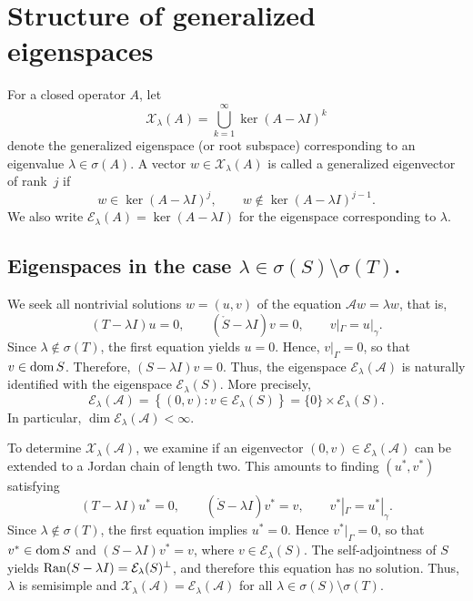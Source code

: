 \documentclass[reqno]{amsart}
\theoremstyle{definition}
\theoremstyle{remark}
\numberwithin{equation}{section}
\newcommand{\dmn}{\mathop{\rm dom}}
\newcommand{\Ran}{\mathop{\rm Ran}}
\newcommand{\cA}{\mathcal{A}}
\newcommand{\cE}{\mathcal{E}}
\newcommand{\cX}{\mathcal{X}}
\begin{document}
\section{Structure of generalized eigenspaces}\label{Section5}
For a closed operator $A$, let
\begin{equation*}
\cX_\lambda(A)=\bigcup_{k=1}^{\infty}\ker(A-\lambda I)^k
\end{equation*}
denote the generalized eigenspace (or root subspace) corresponding to an eigenvalue $\lambda\in\sigma(A)$. A vector $w\in\cX_\lambda(A)$ is called a generalized eigenvector of rank~$j$ if
\begin{equation*}
w\in\ker(A-\lambda I)^j,\qquad w\notin\ker(A-\lambda I)^{j-1}.
\end{equation*}
We also write $\cE_\lambda(A)=\ker(A-\lambda I)$ for the eigenspace corresponding to $\lambda$. 





\subsection{Eigenspaces in the case $\lambda\in\sigma(S)\setminus\sigma(T)$.}
We seek all nontrivial solutions $w=(u,v)$ of the equation $\cA w=\lambda w$, that is,
\begin{equation*}
(T-\lambda I)u=0,\qquad (\mathring{S}-\lambda I)v=0,\qquad v|_\Gamma=u|_\gamma.
\end{equation*}
Since $\lambda\notin\sigma(T)$, the first equation  yields $u=0$. Hence, $v|_\Gamma=0$,  so that $v\in\dmn S$. Therefore, $(S-\lambda I)v=0$. Thus,
the eigenspace $\cE_\lambda(\cA)$ is naturally identified with the eigenspace  $\cE_\lambda(S)$. More precisely,
\begin{equation*}
\cE_\lambda(\cA)=\left\{(0,v)\colon v\in\cE_\lambda(S)\right\}=\{0\}\times\cE_\lambda(S).
\end{equation*}
In particular,
$\dim\cE_\lambda(\cA)<\infty$.

To determine $\cX_\lambda(\cA)$, we examine if an eigenvector $(0,v)\in\cE_\lambda(\cA)$ can be extended to a Jordan chain of length two.
This amounts to finding $(u^*,v^*)$ satisfying
\begin{equation}\label{SystemRank2}
  (T-\lambda I)u^*=0,\qquad   (\mathring S-\lambda I)v^*=v,\qquad   v^*|_\Gamma=u^*|_\gamma.
\end{equation}
Since $\lambda\notin\sigma(T)$, the first equation implies $u^*=0$. Hence $v^*|_\Gamma=0$, so that $v^*\in\dmn S$ and $(S-\lambda I)v^*=v$, where $v\in\cE_\lambda(S)$. The self-adjointness of $S$ yields $\Ran(S-\lambda I)=\cE_\lambda(S)^\perp$, and therefore this equation has no solution. Thus, $\lambda$ is semisimple and $\cX_\lambda(\cA)=\cE_\lambda(\cA)$ for all $\lambda\in\sigma(S)\setminus\sigma(T)$.
\end{document}

